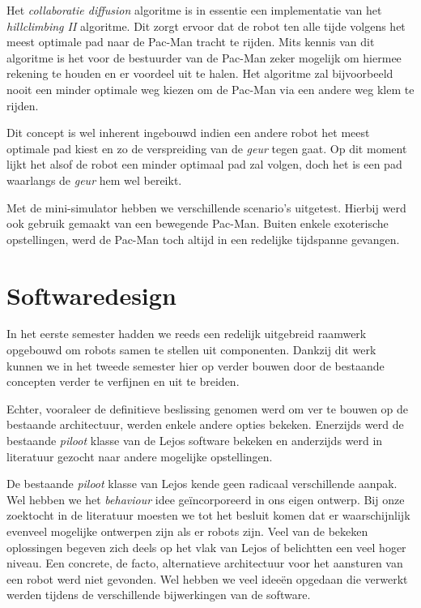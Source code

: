 \documentclass[12pt,a4paper]{report}
\begin{document}
Het \emph{collaboratie diffusion} algoritme is in essentie een implementatie van het \emph{hillclimbing II} algoritme. Dit zorgt ervoor dat de robot ten alle tijde volgens het meest optimale pad naar de Pac-Man tracht te rijden. Mits kennis van dit algoritme is het voor de bestuurder van de Pac-Man zeker mogelijk om hiermee rekening te houden en er voordeel uit te halen. Het algoritme zal bijvoorbeeld nooit een minder optimale weg kiezen om de Pac-Man via een andere weg klem te rijden.

Dit concept is wel inherent ingebouwd indien een andere robot het meest optimale pad kiest en zo de verspreiding van de \emph{geur} tegen gaat. Op dit moment lijkt het alsof de robot een minder optimaal pad zal volgen, doch het is een pad waarlangs de \emph{geur} hem wel bereikt.

Met de mini-simulator hebben we verschillende scenario's uitgetest. Hierbij werd ook gebruik gemaakt van een bewegende Pac-Man. Buiten enkele exoterische opstellingen, werd de Pac-Man toch altijd in een redelijke tijdspanne gevangen.

\chapter{Softwaredesign}

In het eerste semester hadden we reeds een redelijk uitgebreid raamwerk opgebouwd om robots samen te stellen uit componenten. Dankzij dit werk kunnen we in het tweede semester hier op verder bouwen door de bestaande concepten verder te verfijnen en uit te breiden.

Echter, vooraleer de definitieve beslissing genomen werd om ver te bouwen op de bestaande architectuur, werden enkele andere opties bekeken. Enerzijds werd de bestaande \emph{piloot} klasse van de Lejos software bekeken en anderzijds werd in literatuur gezocht naar andere mogelijke opstellingen.

De bestaande \emph{piloot} klasse van Lejos kende geen radicaal verschillende aanpak. Wel hebben we het \emph{behaviour} idee ge\"incorporeerd in ons eigen ontwerp. Bij onze zoektocht in de literatuur moesten we tot het besluit komen dat er waarschijnlijk evenveel mogelijke ontwerpen zijn als er robots zijn. Veel van de bekeken oplossingen begeven zich deels op het vlak van Lejos of belichtten een veel hoger niveau. Een concrete, de facto, alternatieve architectuur voor het aansturen van een robot werd niet gevonden. Wel hebben we veel idee\"en opgedaan die verwerkt werden tijdens de verschillende bijwerkingen van de software.
\end{document}
